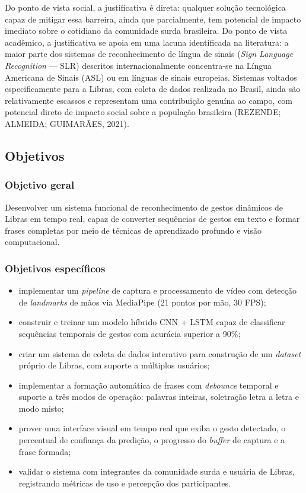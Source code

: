 Do ponto de vista social, a justificativa é direta: qualquer solução tecnológica
capaz de mitigar essa barreira, ainda que parcialmente, tem potencial de impacto
imediato sobre o cotidiano da comunidade surda brasileira. Do ponto de vista
acadêmico, a justificativa se apoia em uma lacuna identificada na literatura: a
maior parte dos sistemas de reconhecimento de língua de sinais (\textit{Sign
Language Recognition} — SLR) descritos internacionalmente concentra-se na Língua
Americana de Sinais (ASL) ou em línguas de sinais europeias. Sistemas voltados
especificamente para a Libras, com coleta de dados realizada no Brasil, ainda são
relativamente escassos e representam uma contribuição genuína ao campo, com
potencial direto de impacto social sobre a população brasileira (REZENDE;
ALMEIDA; GUIMARÃES, 2021).

\subsection{Objetivos}

\subsubsection{Objetivo geral}

Desenvolver um sistema funcional de reconhecimento de gestos dinâmicos de Libras
em tempo real, capaz de converter sequências de gestos em texto e formar frases
completas por meio de técnicas de aprendizado profundo e visão computacional.

\subsubsection{Objetivos específicos}

\begin{itemize}[leftmargin=2cm]
  \item implementar um \textit{pipeline} de captura e processamento de vídeo com
  detecção de \textit{landmarks} de mãos via MediaPipe (21 pontos por mão, 30
  FPS);
  \item construir e treinar um modelo híbrido CNN + LSTM capaz de classificar
  sequências temporais de gestos com acurácia superior a 90\%;
  \item criar um sistema de coleta de dados interativo para construção de um
  \textit{dataset} próprio de Libras, com suporte a múltiplos usuários;
  \item implementar a formação automática de frases com \textit{debounce}
  temporal e suporte a três modos de operação: palavras inteiras, soletração
  letra a letra e modo misto;
  \item prover uma interface visual em tempo real que exiba o gesto detectado, o
  percentual de confiança da predição, o progresso do \textit{buffer} de captura
  e a frase formada;
  \item validar o sistema com integrantes da comunidade surda e usuária de
  Libras, registrando métricas de uso e percepção dos participantes.
\end{itemize}


